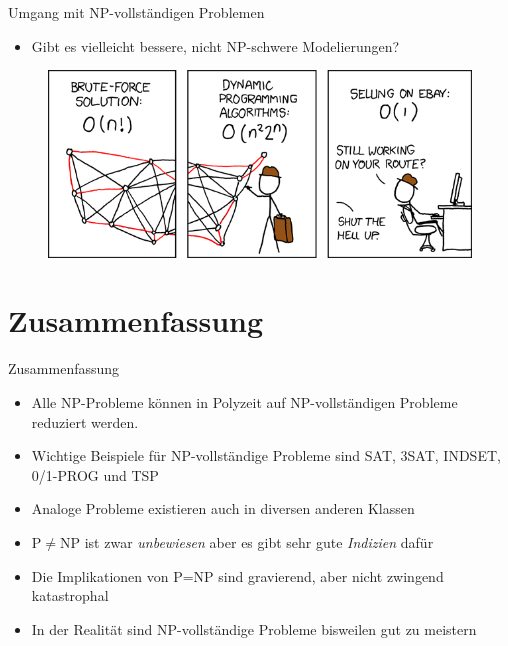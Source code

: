 \documentclass[ignorenonframetext,]{beamer}
\begin{document}
\begin{frame}{Umgang mit NP-vollständigen Problemen}

\begin{itemize}
\itemsep1pt\parskip0pt
\item
  Gibt es vielleicht bessere, nicht NP-schwere Modelierungen?
\end{itemize}

\begin{figure}[htbp]
\centering
\includegraphics{img/travelling_salesman_problem.png}
\end{figure}

\end{frame}

\section{Zusammenfassung}\label{zusammenfassung}

\begin{frame}{Zusammenfassung}

\begin{itemize}
\itemsep1pt\parskip0pt
\item
  Alle NP-Probleme können in Polyzeit auf NP-vollständigen Probleme
  reduziert werden.
\item
  Wichtige Beispiele für NP-vollständige Probleme sind SAT, 3SAT,
  INDSET, 0/1-PROG und TSP
\item
  Analoge Probleme existieren auch in diversen anderen Klassen
\item
  P$\neq$NP ist zwar \emph{unbewiesen} aber es gibt sehr gute
  \emph{Indizien} dafür
\item
  Die Implikationen von P=NP sind gravierend, aber nicht zwingend
  katastrophal
\item
  In der Realität sind NP-vollständige Probleme bisweilen gut zu
  meistern
\end{itemize}

\end{frame}
\end{document}
